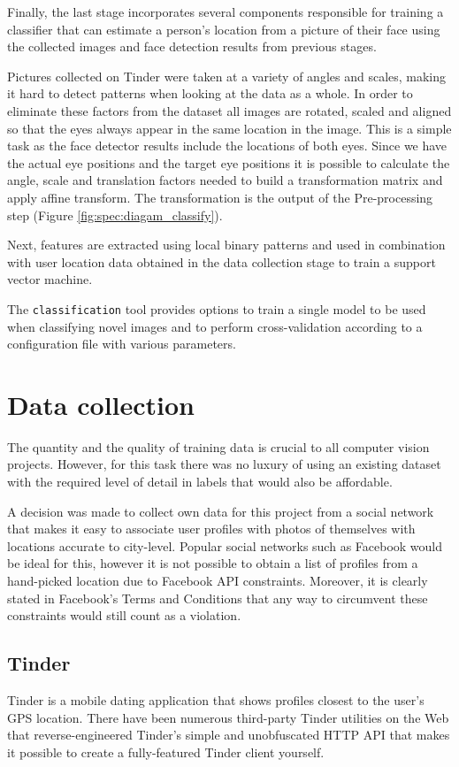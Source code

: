 Finally, the last stage incorporates several components responsible for
training a classifier that can estimate a person's location from a picture of
their face using the collected images and face detection results from previous
stages.

Pictures collected on Tinder were taken at a variety of angles and scales,
making it hard to detect patterns when looking at the data as a whole. In order
to eliminate these factors from the dataset all images are rotated, scaled and
aligned so that the eyes always appear in the same location in the image. This
is a simple task as the face detector results include the locations of both
eyes. Since we have the actual eye positions and the target eye positions it is
possible to calculate the angle, scale and translation factors needed to build
a transformation matrix and apply affine transform. The transformation is the
output of the Pre-processing step (Figure \ref{fig:spec:diagam_classify}). 

Next, features are extracted using local binary patterns and used in
combination with user location data obtained in the data collection stage to
train a support vector machine.

The \texttt{classification} tool provides options to train a single model to be
used when classifying novel images and to perform cross-validation according to
a configuration file with various parameters.


\section{Data collection}
The quantity and the quality of training data is crucial to all computer vision 
projects. However, for this task there was no luxury of using an existing 
dataset with the required level of detail in labels that would also be 
affordable.

A decision was made to collect own data for this project from a social network 
that makes it easy to associate user profiles with photos of themselves with 
locations accurate to city-level. Popular social networks such as Facebook 
would be ideal for this, however it is not possible to obtain a list of 
profiles from a hand-picked location due to Facebook API constraints. 
Moreover, it is clearly stated in Facebook's Terms and Conditions that any way 
to circumvent these constraints would still count as a violation.


\subsection{Tinder}
Tinder is a mobile dating application that shows profiles closest to the 
user's GPS location. There have been numerous third-party Tinder utilities on 
the Web that reverse-engineered Tinder's simple and unobfuscated HTTP API that 
makes it possible to create a fully-featured Tinder client yourself.

